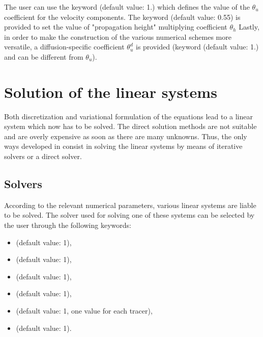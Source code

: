 The user can use the keyword  (default
value: 1.) which defines the value of the $\theta_{u}$ coefficient for the
velocity components. The keyword  (default
value: 0.55) is provided to set the value of "propagation height" multiplying
coefficient $\theta_{h}$ Lastly, in order to make the construction of the
various numerical schemes more versatile, a diffusion-specific coefficient
$\theta_{u}^{d}$ is provided (keyword 
(default value: 1.) and can be different from $\theta_{u}$).


\section{Solution of the linear systems}

Both discretization and variational formulation of the equations lead to a
linear system which now has to be solved. The direct solution methods are not
suitable and are overly expensive as soon as there are many unknowns. Thus, the
only ways developed in  consist in solving the linear systems by
means of iterative solvers or a direct solver.


\subsection{Solvers}
\label{sec:solver}
According to the relevant numerical parameters, various linear systems are
liable to be solved. The solver used for solving one of these systems can be
selected by the user through the following keywords:

\begin{itemize}
\item {} (default value: 1),

\item {} (default value: 1),

\item {} (default value: 1),

\item {} (default value: 1),

\item {} (default value: 1, one value for
each tracer),

\item {}(default value: 1).
\end{itemize}

